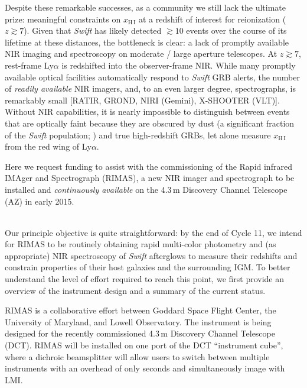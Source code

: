 \documentclass[letterpaper,11pt]{article}
\begin{document}
Despite these remarkable successes, as a community we still lack the ultimate
prize: meaningful constraints on $x_{\mathrm{H\,I}}$ at a redshift of interest
for reionization ($z \gtrsim 7$).  Given that \textit{Swift} has likely detected
$\gtrsim 10$ events over the course of its lifetime at these distances, the
bottleneck is clear: a lack of promptly available NIR imaging and spectroscopy 
on moderate / large aperture telescopes.  At $z \gtrsim 7$, rest-frame Ly$\alpha$
is redshifted into the observer-frame NIR.  While many promptly available 
optical facilities automatically respond to \textit{Swift} GRB alerts, the number
of \textit{readily available} NIR imagers, and, to an even larger degree,
spectrographs, is remarkably small [RATIR, GROND, NIRI (Gemini), X-SHOOTER (VLT)].
Without NIR capabilities, it is nearly impossible to distinguish between events
that are optically faint because they are obscured by dust (a significant fraction
of the \textit{Swift} population; \cite{ckh+09,pcb+09,gkk+11}) and true
high-redshift GRBs, let alone measure $x_{\mathrm{H\,I}}$ from the red wing of
Ly$\alpha$.

Here we request funding to assist with the commissioning of the Rapid infrared
IMAger and Spectrograph (RIMAS), a new NIR imager and spectrograph to be installed and 
\textit{continuously available} on the 4.3\,m Discovery Channel Telescope (AZ) in early 
2015.

\smallskip

\smallskip\\
Our principle objective is quite straightforward: by the end of Cycle 11, we intend
for RIMAS to be routinely obtaining rapid multi-color photometry and (as appropriate) 
NIR spectroscopy of \textit{Swift} afterglows to measure their redshifts and constrain 
properties of their host galaxies and the surrounding IGM.  To better understand the 
level of effort required to reach this point, we first provide an overview of the 
instrument design and a summary of the current status.

\smallskip

RIMAS is a collaborative effort between Goddard Space Flight Center, the University of
Maryland, and Lowell Observatory.  The instrument is being designed for the recently
commissioned 4.3\,m Discovery Channel Telescope (DCT).  RIMAS will be installed on one 
port of the DCT ``instrument cube'', where a dichroic beamsplitter will allow users to
switch between multiple instruments with an overhead of only seconds and simultaneously
image with LMI.
\end{document}

